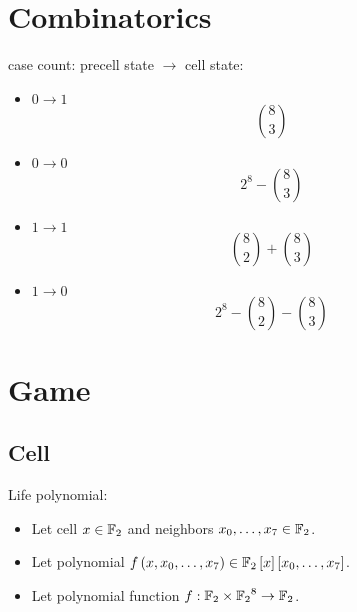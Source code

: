 \documentclass[letterpaper, 17pt]{extarticle}
\begin{document}

\begin{center}
\Large{\mytitle}
\end{center}

\tableofcontents

\begin{flushleft}


\section{Combinatorics}

\begin{remark}
case count: precell state $\to$ cell state:
\begin{itemize}
\item $0 \to 1$ $$\binom{8}{3}$$
\item $0 \to 0$ $$2^8 - \binom{8}{3}$$
\item $1 \to 1$ $$\binom{8}{2} + \binom{8}{3}$$
\item $1 \to 0$ $$2^8 - \binom{8}{2} - \binom{8}{3}$$
\end{itemize}
\end{remark}


\section{Game}


\subsection{Cell}

\begin{definition}
Life polynomial:
\begin{itemize}
\item Let cell $x \in \mathbb{F}_2$ and
  neighbors $x_{0}, \ldots, x_{7} \in \mathbb{F}_2$.
\item Let polynomial $f \left( x, x_{0}, \ldots, x_{7} \right) \in \mathbb{F}_2 \left[ x \right] \left[ x_{0}, \ldots, x_{7} \right]$.
\item Let polynomial function
  $f: \mathbb{F}_2 \times {\mathbb{F}_2}^8 \to \mathbb{F}_2$.
\end{itemize}
\end{definition}


\end{flushleft}
\end{document}
